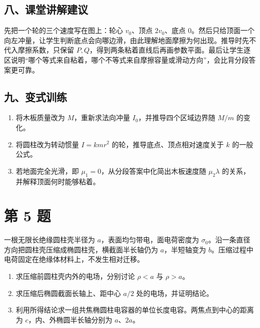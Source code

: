 \documentclass[12pt,a4paper,UTF8]{ctexart}
\newcommand{\tightlist}{\setlength{\itemsep}{0pt}\setlength{\parskip}{0pt}}
\begin{document}
\subsection{八、课堂讲解建议}\label{ux516bux8bfeux5802ux8bb2ux89e3ux5efaux8bae-3}

先把一个轮的三个速度写在图上：轮心 \(v_0\)、顶点 \(2v_0\)、底点
\(0\)。然后只给顶面一个向左冲量，让学生判断底点会向哪边滑，由此理解地面摩擦为何出现。推导时先不代入摩擦系数，只保留
\(P,Q\)，得到两条粘着直线后再画参数平面。最后让学生逐区说明``哪个等式来自粘着，哪个不等式来自摩擦容量或滑动方向''，会比背分段答案更可靠。

\subsection{九、变式训练}\label{ux4e5dux53d8ux5f0fux8badux7ec3-3}

\begin{enumerate}
\def\labelenumi{\arabic{enumi}.}
\tightlist
\item
  将木板质量改为 \(M\)，重新求法向冲量 \(I_0\)，并推导四个区域边界随
  \(M/m\) 的变化。
\item
  将圆柱改为转动惯量 \(I=kmr^2\) 的轮，推导底点、顶点相对速度关于 \(k\)
  的一般公式。
\item
  若地面完全光滑，即 \(\mu_1=0\)，从分段答案中化简出木板速度随
  \(\mu_2\lambda\) 的关系，并解释顶面何时能够粘着。
\end{enumerate}

\newpage

\section{第 5 题}\label{ux7b2c-5-ux9898}

一根无限长绝缘圆柱壳半径为 \(a\)，表面均匀带电，面电荷密度为
\(\sigma_0\)。沿一条直径方向把圆柱壳压缩成椭圆柱壳，横截面半长轴仍为
\(a\)，半短轴变为
\(b\)。压缩过程中电荷固定在绝缘体材料上，不发生相对迁移。

\begin{enumerate}
\def\labelenumi{\arabic{enumi}.}
\tightlist
\item
  求压缩前圆柱壳内外的电场，分别讨论 \(\rho<a\) 与 \(\rho>a\)。
\item
  求压缩后椭圆截面长轴上、距中心 \(a/2\) 处的电场，并证明结论。
\item
  利用所得结论求一组共焦椭圆柱电容器的单位长度电容。两焦点到中心的距离为
  \(c\)，内、外椭圆半长轴分别为 \(a\)、\(2a\)。
\end{enumerate}
\end{document}
